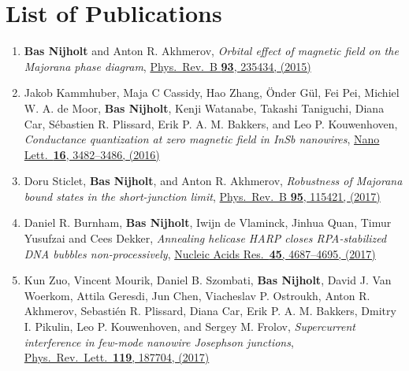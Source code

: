 \chapter*{List of Publications}
\label{publications}

\begin{enumerate}

\item \textbf{Bas Nijholt} and Anton R. Akhmerov, \textit{Orbital effect of magnetic field on the Majorana phase diagram}, \href{https://doi.org/10.1103/PhysRevB.93.235434}{Phys.~Rev.~B \textbf{93}, 235434, (2015)}

\item Jakob Kammhuber, Maja C Cassidy, Hao Zhang, {\"O}nder G{\"u}l, Fei Pei, Michiel W. A. de Moor, \textbf{Bas Nijholt}, Kenji Watanabe, Takashi Taniguchi, Diana Car, S{\'e}bastien R. Plissard, Erik P. A. M. Bakkers, and Leo P. Kouwenhoven, \textit{Conductance quantization at zero magnetic field in InSb nanowires}, \href{https://doi.org/10.1021/acs.nanolett.6b00051}{Nano Lett.~\textbf{16}, 3482--3486, (2016)}

\item Doru Sticlet, \textbf{Bas Nijholt}, and Anton R. Akhmerov, \textit{Robustness of Majorana bound states in the short-junction limit}, \href{https://doi.org/10.1103/PhysRevB.95.115421}{Phys.~Rev.~B \textbf{95}, 115421, (2017)}

\item Daniel R. Burnham, \textbf{Bas Nijholt}, Iwijn de Vlaminck,  Jinhua Quan, Timur Yusufzai and Cees Dekker, \textit{Annealing helicase HARP closes RPA-stabilized DNA bubbles non-processively}, \href{https://doi.org/10.1093/nar/gkx147}{Nucleic Acids Res.~\textbf{45}, 4687--4695, (2017)}

\item Kun Zuo, Vincent Mourik, Daniel B. Szombati, \textbf{Bas Nijholt}, David J. Van Woerkom, Attila Geresdi, Jun Chen, Viacheslav P. Ostroukh, Anton R. Akhmerov, Sebasti{\'e}n R. Plissard, Diana Car, Erik P. A. M. Bakkers, Dmitry I. Pikulin, Leo P. Kouwenhoven, and Sergey M. Frolov, \textit{Supercurrent interference in few-mode nanowire Josephson junctions}, \href{https://doi.org/10.1103/PhysRevLett.119.187704}{Phys.~Rev.~Lett.~\textbf{119}, 187704, (2017)}


\end{enumerate}
